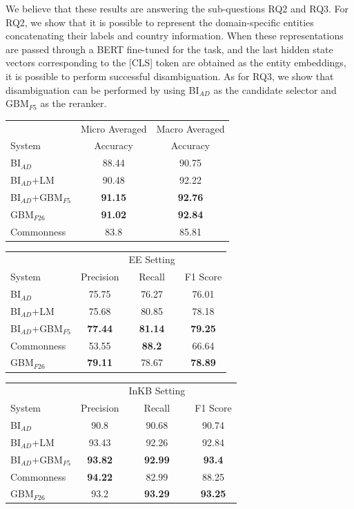 \documentclass{report}
\theoremstyle{definition}
\theoremstyle{remark}
\begin{document}
We believe that these results are answering the sub-questions RQ2 and RQ3. For RQ2, we show that it is possible to represent the domain-specific entities concatenating their labels and country information. When these representations are passed through a BERT fine-tuned for the task, and the last hidden state vectors corresponding to the [CLS] token are obtained as the entity embeddings, it is possible to perform successful disambiguation. As for RQ3, we show that disambiguation can be performed by using BI$_{AD}$ as the candidate selector and GBM$_{F5}$ as the reranker.

\begin{table}
    \centering
    \begin{tabular}{lcc}
    &Micro Averaged & Macro Averaged\\
    System     & Accuracy &Accuracy \\
    \hline
    BI$_{AD}$   & 88.44&90.75\\
    BI$_{AD}$+LM& 90.48 &92.22\\
    BI$_{AD}$+GBM$_{F5}$ &\textcolor{ao}{\textbf{91.15}} &\textbf{92.76}\\
    GBM$_{F26}$ & \textbf{91.02}&\textcolor{ao}{\textbf{92.84}}\\
    Commonness  &83.8&85.81 \\
    \end{tabular}
    
    \vspace{0.5cm}\begin{tabular}{lccc}
    &&EE Setting & \\
    System    & Precision & Recall & F1 Score \\
    \hline
    BI$_{AD}$  &  75.75& 76.27&	76.01\\
    BI$_{AD}$+LM & 75.68& 80.85& 78.18\\
    BI$_{AD}$+GBM$_{F5}$ &\textbf{77.44}&\textbf{81.14} &\textcolor{ao}{\textbf{79.25}}\\
    Commonness  & 53.55& \textcolor{ao}{\textbf{88.2}}&	66.64 \\
    GBM$_{F26}$  & \textcolor{ao}{\textbf{79.11}}& 78.67&	\textbf{78.89} \\
    \end{tabular}
    
    \vspace{0.5cm}\begin{tabular}{lccc}
    &&InKB Setting & \\
    System    & Precision & Recall & F1 Score \\
    \hline
    BI$_{AD}$   & 90.8&90.68&	90.74\\
    BI$_{AD}$+LM  & 93.43& 92.26& 92.84\\
    BI$_{AD}$+GBM$_{F5}$ &\textbf{93.82} &\textbf{92.99} &\textcolor{ao}{\textbf{93.4}}\\
    Commonness  & \textcolor{ao}{\textbf{94.22}}&82.99	&88.25 \\
     GBM$_{F26}$   & 93.2&\textcolor{ao}{\textbf{93.29}}&	\textbf{93.25}\\
    \end{tabular}
       

\end{table}
\end{document}

